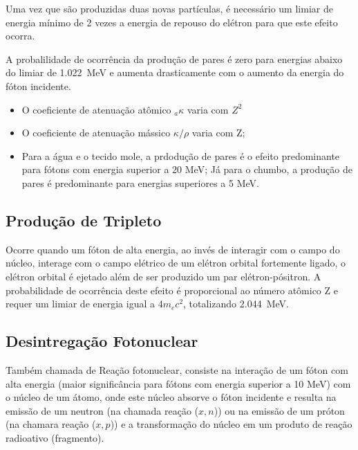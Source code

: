 \documentclass[11pt,a4paper]{article}
\begin{document}
                Uma vez que são produzidas duas novas partículas, é necessário um limiar de energia mínimo de 2 vezes a energia de repouso do elétron para que este efeito ocorra. 

                A probalilidade de ocorrência da produção de pares é zero para energias abaixo do limiar de \qty{1.022}{MeV} e aumenta drasticamente com o aumento da energia do fóton incidente. 

                \begin{itemize}
                    \item O coeficiente de atenuação atômico ${}_a\kappa$ varia com $Z^2$
                    \item O coeficiente de atenuação mássico $\kappa/\rho$ varia com Z;
                    \item Para a água e o tecido mole, a prdodução de pares é o efeito predominante para fótons com energia superior a 20 MeV; Já para o chumbo, a produção de pares é predominante para energias superiores a 5 MeV.
                \end{itemize}

\subsection*{Produção de Tripleto}

    Ocorre quando um fóton de alta energia, ao invés de interagir com o campo do núcleo, interage com o campo elétrico de um elétron orbital fortemente ligado, o elétron orbital é ejetado além de ser produzido um par elétron-pósitron. A probabilidade de ocorrência deste efeito é proporcional ao número atômico Z e requer um limiar de energia igual a $4 m_ec^2$, totalizando \qty{2.044}{MeV}. 

\subsection*{Desintregação Fotonuclear}

    Também chamada de Reação fotonuclear, consiste na interação de um fóton com alta energia (maior significância para fótons com energia superior a 10 MeV) com o núcleo de um átomo, onde este núcleo absorve o fóton incidente e resulta na emissão de um neutron (na chamada reação ($x, n$)) ou na emissão de um próton (na chamara reação ($x, p$)) e a transformação do núcleo em um produto de reação radioativo (fragmento).
\end{document}
